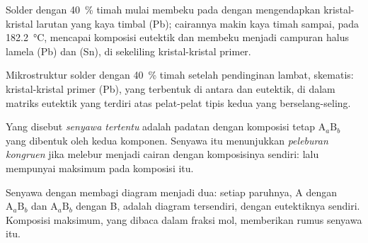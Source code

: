 Solder dengan 40~\% timah mulai membeku pada  dengan mengendapkan
kristal-kristal larutan yang kaya timbal (Pb); cairannya makin kaya timah
sampai, pada \qty{182.2}{\degreeCelsius}, mencapai komposisi eutektik dan
membeku menjadi campuran halus lamela (Pb) dan (Sn), di sekeliling
kristal-kristal primer.

\begin{omfigure}

{\small Mikrostruktur solder dengan 40~\% timah setelah pendinginan lambat,
skematis: kristal-kristal primer (Pb), yang terbentuk di antara 
dan eutektik, di dalam matriks eutektik yang terdiri atas pelat-pelat
tipis kedua  yang berselang-seling.}
\end{omfigure}

\begin{definition}\label{def:b2:solid-liquid-diagrams:defined-compound}
Yang disebut \emph{senyawa tertentu} adalah padatan
dengan komposisi tetap $\mathrm{A}_a\mathrm{B}_b$ yang dibentuk oleh kedua
komponen. Senyawa itu menunjukkan \emph{peleburan
kongruen} jika melebur menjadi cairan dengan
komposisinya sendiri:  lalu mempunyai maksimum pada komposisi itu.
\end{definition}

Senyawa dengan  membagi diagram menjadi dua: setiap
paruhnya, A dengan $\mathrm{A}_a\mathrm{B}_b$ dan $\mathrm{A}_a\mathrm{B}_b$
dengan B, adalah diagram tersendiri, dengan eutektiknya sendiri. Komposisi
maksimum, yang dibaca dalam fraksi mol, memberikan rumus senyawa itu.

